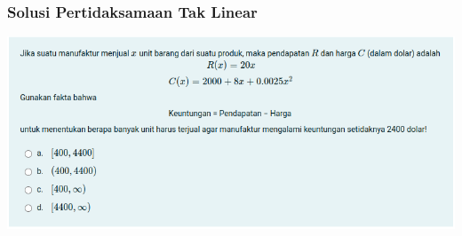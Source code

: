 \documentclass[pdflatex,compress,mathserif]{beamer}
\begin{document}
\begin{frame}
	\frametitle{Solusi Pertidaksamaan Tak Linear}
	\begin{center}
		\includegraphics[width=\linewidth]{img/img27}
	\end{center}
\end{frame}
\end{document}
